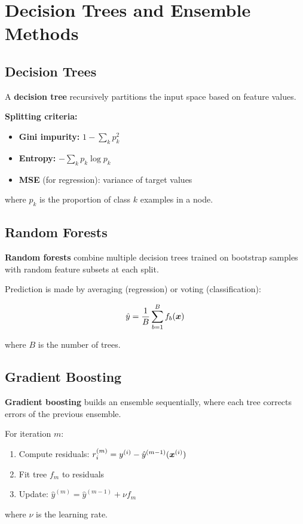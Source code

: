 
\section{Decision Trees and Ensemble Methods}
\label{sec:decision-trees}

\subsection{Decision Trees}

A \textbf{decision tree} recursively partitions the input space based on feature values.

\textbf{Splitting criteria:}
\begin{itemize}
    \item \textbf{Gini impurity:} $1 - \sum_{k} p_k^2$
    \item \textbf{Entropy:} $-\sum_{k} p_k \log p_k$
    \item \textbf{MSE} (for regression): variance of target values
\end{itemize}

where $p_k$ is the proportion of class $k$ examples in a node.

\subsection{Random Forests}

\textbf{Random forests} combine multiple decision trees trained on bootstrap samples with random feature subsets at each split.

Prediction is made by averaging (regression) or voting (classification):

\begin{equation}
\hat{y} = \frac{1}{B} \sum_{b=1}^{B} f_b(\boldsymbol{x})
\end{equation}

where $B$ is the number of trees.

\subsection{Gradient Boosting}

\textbf{Gradient boosting} builds an ensemble sequentially, where each tree corrects errors of the previous ensemble.

For iteration $m$:
\begin{enumerate}
    \item Compute residuals: $r_i^{(m)} = y^{(i)} - \hat{y}^{(m-1)}(\boldsymbol{x}^{(i)})$
    \item Fit tree $f_m$ to residuals
    \item Update: $\hat{y}^{(m)} = \hat{y}^{(m-1)} + \nu f_m$
\end{enumerate}

where $\nu$ is the learning rate.

